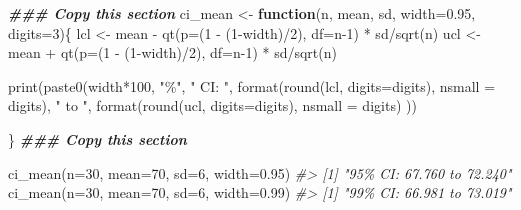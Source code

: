 \documentclass[
]{memoir}
\newenvironment{Shaded}{\begin{snugshade}}{\end{snugshade}}
\newcommand{\AttributeTok}[1]{\textcolor[rgb]{0.77,0.63,0.00}{#1}}
\newcommand{\CommentTok}[1]{\textcolor[rgb]{0.56,0.35,0.01}{\textit{#1}}}
\newcommand{\ControlFlowTok}[1]{\textcolor[rgb]{0.13,0.29,0.53}{\textbf{#1}}}
\newcommand{\DecValTok}[1]{\textcolor[rgb]{0.00,0.00,0.81}{#1}}
\newcommand{\DocumentationTok}[1]{\textcolor[rgb]{0.56,0.35,0.01}{\textbf{\textit{#1}}}}
\newcommand{\FloatTok}[1]{\textcolor[rgb]{0.00,0.00,0.81}{#1}}
\newcommand{\FunctionTok}[1]{\textcolor[rgb]{0.00,0.00,0.00}{#1}}
\newcommand{\NormalTok}[1]{#1}
\newcommand{\OtherTok}[1]{\textcolor[rgb]{0.56,0.35,0.01}{#1}}
\newcommand{\SpecialCharTok}[1]{\textcolor[rgb]{0.00,0.00,0.00}{#1}}
\newcommand{\StringTok}[1]{\textcolor[rgb]{0.31,0.60,0.02}{#1}}
\begin{document}
\begin{Shaded}
\begin{Highlighting}[]
\DocumentationTok{\#\#\# Copy this section}
\NormalTok{ci\_mean }\OtherTok{\textless{}{-}} \ControlFlowTok{function}\NormalTok{(n, mean, sd, }\AttributeTok{width=}\FloatTok{0.95}\NormalTok{, }\AttributeTok{digits=}\DecValTok{3}\NormalTok{)\{}
\NormalTok{  lcl }\OtherTok{\textless{}{-}}\NormalTok{ mean }\SpecialCharTok{{-}} \FunctionTok{qt}\NormalTok{(}\AttributeTok{p=}\NormalTok{(}\DecValTok{1} \SpecialCharTok{{-}}\NormalTok{ (}\DecValTok{1}\SpecialCharTok{{-}}\NormalTok{width)}\SpecialCharTok{/}\DecValTok{2}\NormalTok{), }\AttributeTok{df=}\NormalTok{n}\DecValTok{{-}1}\NormalTok{) }\SpecialCharTok{*}\NormalTok{ sd}\SpecialCharTok{/}\FunctionTok{sqrt}\NormalTok{(n)}
\NormalTok{  ucl }\OtherTok{\textless{}{-}}\NormalTok{ mean }\SpecialCharTok{+} \FunctionTok{qt}\NormalTok{(}\AttributeTok{p=}\NormalTok{(}\DecValTok{1} \SpecialCharTok{{-}}\NormalTok{ (}\DecValTok{1}\SpecialCharTok{{-}}\NormalTok{width)}\SpecialCharTok{/}\DecValTok{2}\NormalTok{), }\AttributeTok{df=}\NormalTok{n}\DecValTok{{-}1}\NormalTok{) }\SpecialCharTok{*}\NormalTok{ sd}\SpecialCharTok{/}\FunctionTok{sqrt}\NormalTok{(n)}
  
  \FunctionTok{print}\NormalTok{(}\FunctionTok{paste0}\NormalTok{(width}\SpecialCharTok{*}\DecValTok{100}\NormalTok{, }\StringTok{"\%"}\NormalTok{, }\StringTok{" CI: "}\NormalTok{, }\FunctionTok{format}\NormalTok{(}\FunctionTok{round}\NormalTok{(lcl, }\AttributeTok{digits=}\NormalTok{digits), }\AttributeTok{nsmall =}\NormalTok{ digits),}
               \StringTok{" to "}\NormalTok{, }\FunctionTok{format}\NormalTok{(}\FunctionTok{round}\NormalTok{(ucl, }\AttributeTok{digits=}\NormalTok{digits), }\AttributeTok{nsmall =}\NormalTok{ digits) ))}

\NormalTok{\}}
\DocumentationTok{\#\#\# Copy this section}

\FunctionTok{ci\_mean}\NormalTok{(}\AttributeTok{n=}\DecValTok{30}\NormalTok{, }\AttributeTok{mean=}\DecValTok{70}\NormalTok{, }\AttributeTok{sd=}\DecValTok{6}\NormalTok{, }\AttributeTok{width=}\FloatTok{0.95}\NormalTok{)}
\CommentTok{\#\textgreater{} [1] "95\% CI: 67.760 to 72.240"}
\FunctionTok{ci\_mean}\NormalTok{(}\AttributeTok{n=}\DecValTok{30}\NormalTok{, }\AttributeTok{mean=}\DecValTok{70}\NormalTok{, }\AttributeTok{sd=}\DecValTok{6}\NormalTok{, }\AttributeTok{width=}\FloatTok{0.99}\NormalTok{)}
\CommentTok{\#\textgreater{} [1] "99\% CI: 66.981 to 73.019"}
\end{Highlighting}
\end{Shaded}
\end{document}
